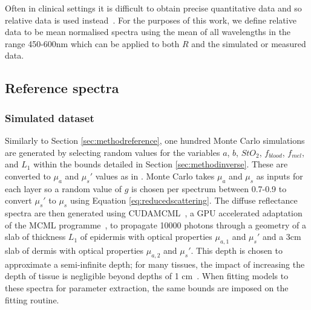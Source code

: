 Often in clinical settings it is difficult to obtain precise quantitative data and so relative data is used instead~\cite{Bahl2023}. For the
purposes of this work, we define relative data to be mean normalised spectra using the mean of all wavelengths in the range 450-600nm which can be applied to both $R$ and the simulated or measured data. 
%

\subsection{Reference spectra}\label{sec:methodreference2}
\subsubsection{Simulated dataset}
Similarly to Section \ref{sec:methodreference}, one hundred
Monte Carlo simulations are generated by selecting random values for the variables $a$, $b$, $StO_2$, $f_{blood}$, $f_{mel}$, and $L_1$ within the bounds detailed in Section \ref{sec:methodinverse}.
These are converted to $\mu_a$ and $\mu_s'$ values as in . Monte Carlo takes $\mu_a$ and $\mu_s$ as inputs for each layer so a random value of $g$ is chosen per spectrum between 0.7-0.9 to convert $\mu_s'$ to $\mu_s$ using Equation \eqref{eq:reducedscattering}. The diffuse reflectance spectra are then generated using CUDAMCML~\cite{Alerstam2008}, a GPU accelerated adaptation of the MCML programme~\cite{Wang1995}, to propagate 10000 photons through a geometry of a slab of thickness $L_1$ of epidermis with optical properties $\mu_{a,1}$ and $\mu_s'$ and a 3cm slab of dermis with optical properties $\mu_{a, 2}$ and $\mu_s'$. This depth is chosen to approximate a semi-infinite depth; for many tissues, the impact of increasing the depth of tissue is negligible beyond depths of 1 cm~\cite{Zhang2014}. When fitting models to these spectra for parameter extraction, the same bounds are imposed on the fitting routine. 

